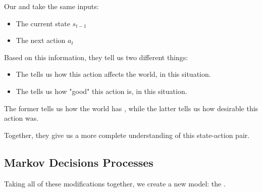         \begin{concept}
            Our  and  take the same inputs:

            \begin{itemize}
                \item The current state $s_{t-1}$
                \item The next action $a_t$
            \end{itemize}

            Based on this information, they tell us two different things:

            \begin{itemize}
                \item The  tells us how this action affects the world, in this situation.
                \item The  tells us how "good" this action is, in this situation.
                
            \end{itemize}

            The former tells us how the world has , while the latter tells us how  desirable this action was.
        \end{concept}

        Together, they give us a more complete understanding of this state-action pair.

        


        

        \pagebreak

    \subsection{Markov Decisions Processes}

        Taking all of these modifications together, we create a new model: the .\\

